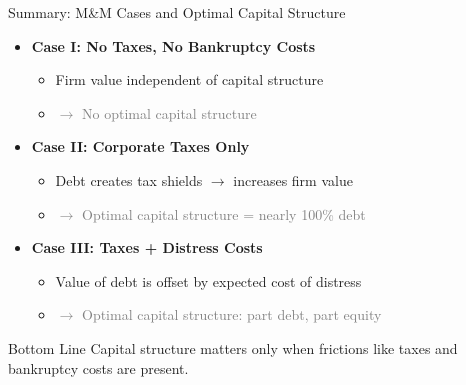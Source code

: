 \begin{frame}{Summary: M\&M Cases and Optimal Capital Structure}
	
	\begin{itemize}
		\item \textbf{Case I: No Taxes, No Bankruptcy Costs}
		\begin{itemize}
			\item Firm value independent of capital structure
			\item \textcolor{gray}{$\rightarrow$ No optimal capital structure}
		\end{itemize}
		
		\vspace{2mm}
		\item \textbf{Case II: Corporate Taxes Only}
		\begin{itemize}
			\item Debt creates tax shields $\rightarrow$ increases firm value
			\item \textcolor{gray}{$\rightarrow$ Optimal capital structure = nearly 100\% debt}
		\end{itemize}
		
		\vspace{2mm}
		\item \textbf{Case III: Taxes + Distress Costs}
		\begin{itemize}
			\item Value of debt is offset by expected cost of distress
			\item \textcolor{gray}{$\rightarrow$ Optimal capital structure: part debt, part equity}
		\end{itemize}
	\end{itemize}
	
	\vspace{0.2cm}
	\begin{alertblock}{Bottom Line}
		Capital structure matters only when frictions like taxes and bankruptcy costs are present.
	\end{alertblock}
	
\end{frame}

